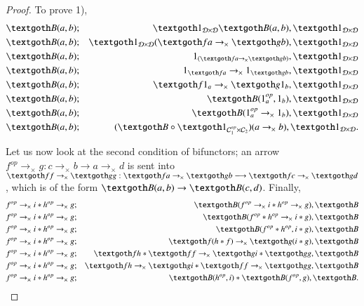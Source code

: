 \documentclass [12pt]{book}
\begin{document}
\begin{proof}To prove 1),\begin{eqnarray}\nonumber\textgoth B(a,b)&;&\textgoth1_{\mathcal D\times\mathcal D}\textgoth B(a,b),\textgoth1_{\mathcal D\times\mathcal D}\\\nonumber\textgoth B(a,b)&;&\textgoth1_{\mathcal D\times\mathcal D}(\textgoth fa\rightarrow_\times\textgoth gb),\textgoth1_{\mathcal D\times\mathcal D}\\\nonumber\textgoth B(a,b)&;&1_{(\textgoth fa\rightarrow_\times\textgoth gb)},\textgoth1_{\mathcal D\times\mathcal D}\\\nonumber\textgoth B(a,b)&;&1_{\textgoth fa}\rightarrow_\times1_{\textgoth gb},\textgoth1_{\mathcal D\times\mathcal D}\\\nonumber\textgoth B(a,b)&;&\textgoth f1_a\rightarrow_\times\textgoth g1_b,\textgoth1_{\mathcal D\times\mathcal D}\\\nonumber\textgoth B(a,b)&;&\textgoth B(1_a^{op},1_b),\textgoth1_{\mathcal D\times\mathcal D}\\\nonumber\textgoth B(a,b)&;&\textgoth B(1_a^{op}\rightarrow_\times 1_b),\textgoth1_{\mathcal D\times\mathcal D}\\\nonumber\textgoth B(a,b)&;&(\textgoth B\circ\textgoth1_{\mathcal C_1^{op}\times\mathcal C_2})(a\rightarrow_\times b),\textgoth1_{\mathcal D\times\mathcal D}.\end{eqnarray}

Let us now look at the second condition of bifunctors; an arrow $f^{op}\rightarrow_\times g:c\rightarrow_\times b\longrightarrow a\rightarrow_\times d$ is sent into $\textgoth ff\rightarrow_\times\textgoth gg:\textgoth fa\rightarrow_\times\textgoth gb\longrightarrow\textgoth fc\rightarrow_\times\textgoth gd$, which is of the form $\textgoth B(a,b)\rightarrow\textgoth B(c,d)$. Finally,\begin{eqnarray}\nonumber f^{op}\rightarrow_\times i*h^{op}\rightarrow_\times g&;&\textgoth B(f^{op}\rightarrow_\times i*h^{op}\rightarrow_\times g),\textgoth B\\\nonumber f^{op}\rightarrow_\times i*h^{op}\rightarrow_\times g&;&\textgoth B(f^{op}*h^{op}\rightarrow_\times i*g),\textgoth B\\\nonumber f^{op}\rightarrow_\times i*h^{op}\rightarrow_\times g&;&\textgoth B(f^{op}*h^{op},i*g),\textgoth B\\\nonumber f^{op}\rightarrow_\times i*h^{op}\rightarrow_\times g&;& \textgoth f(h*f)\rightarrow_\times\textgoth g(i*g),\textgoth B\\\nonumber f^{op}\rightarrow_\times i*h^{op}\rightarrow_\times g&;&\textgoth fh*\textgoth ff\rightarrow_\times\textgoth gi*\textgoth gg,\textgoth B\\\nonumber f^{op}\rightarrow_\times i*h^{op}\rightarrow_\times g&;&\textgoth fh\rightarrow_\times\textgoth gi*\textgoth ff\rightarrow_\times\textgoth gg,\textgoth B\\\nonumber f^{op}\rightarrow_\times i*h^{op}\rightarrow_\times g&;&\textgoth B(h^{op},i)*\textgoth B(f^{op},g),\textgoth B.\end{eqnarray}\end{proof}
\end{document}
